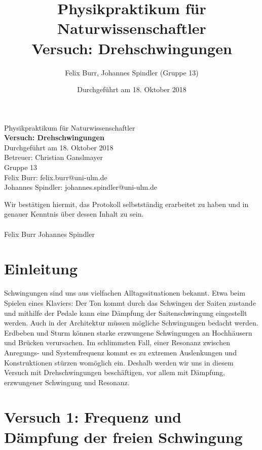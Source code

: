 \documentclass{scrartcl}
\title{Physikpraktikum für Naturwissenschaftler \\ Versuch: Drehschwingungen}
\author{Felix Burr, Johannes Spindler (Gruppe 13)}
\date{Durchgeführt am 18. Oktober 2018}
\begin{document}
\begin{titlepage}
  \begin{center}
    \vspace*{1cm}
    \LARGE
    Physikpraktikum für Naturwissenschaftler \\
    \vspace*{1cm}
    \Huge
    \textbf{Versuch: Drehschwingungen} \\
    \vspace*{0.3cm}
    \Large
    Durchgeführt am 18. Oktober 2018 \\
    Betreuer: Christian Ganslmayer \\
    \vspace*{2.5cm}
    Gruppe 13 \\
    Felix Burr: felix.burr@uni-ulm.de \\
    Johannes Spindler: johannes.spindler@uni-ulm.de \\
    \vfill 
  \end{center}
  Wir bestätigen hiermit, das Protokoll selbstständig erarbeitet zu haben und in genauer Kenntnis über dessen Inhalt zu sein. \\
  \vspace*{0.8cm}
  \\
  Felix Burr
  \hfill
  Johannes Spindler
\end{titlepage}
\pagebreak
\tableofcontents


\pagebreak

\section{Einleitung}
Schwingungen sind uns aus vielfachen Alltagssituationen bekannt. Etwa beim Spielen eines Klaviers: Der Ton kommt durch das Schwingen der Saiten zustande und mithilfe der Pedale kann eine Dämpfung der Saitenschwingung eingestellt werden.
Auch in der Architektur müssen mögliche Schwingungen bedacht werden. Erdbeben und Sturm können starke erzwungene Schwingungen an Hochhäusern und Brücken verursachen. Im schlimmsten Fall, einer Resonanz zwischen Anregungs- und Systemfrequenz kommt es zu extremen Auslenkungen und Konstruktionen stürzen womöglich ein.
Deshalb werden wir uns in diesem Versuch mit Drehschwingungen beschäftigen, vor allem mit Dämpfung, erzwungener Schwingung und Resonanz.
\section{Versuch 1: Frequenz und Dämpfung der freien Schwingung}
\end{document}
